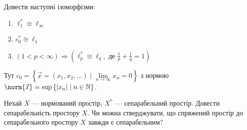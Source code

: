 \begin{exercise}
    Довести наступні ізоморфізми:
    \begin{enumerate}[label=\ukr*)]
        \item $\ell_1^* \cong \ell_\infty$
        \item $c_0^* \cong \ell_1$
        \item $\left( 1<p<\infty\right) \Rightarrow \left( \ell_p^* \cong \ell_q, \text{ де } \frac{1}{p} + \frac{1}{q} = 1\right)$
    \end{enumerate}
    Тут $c_0 = \left\{ \vec{x} = (x_1, x_2, ...) \; | \; \underset{n\rightarrow\infty}{\lim} x_n = 0\right\}$ 
    з нормою $\norm{\vec{x}} = \sup\left\{|x_n| \; | \; n \in \mathbb{N}\right\}$.
\end{exercise}

\begin{exercise}[*]
    Нехай $X$ --- нормований простір, $X^*$ --- сепарабельний простір. Довести сепарабельність простору $X$.
    Чи можна стверджувати, що спряжений простір до сепарабельного простору $X$ завжди є сепарабельним?
\end{exercise}